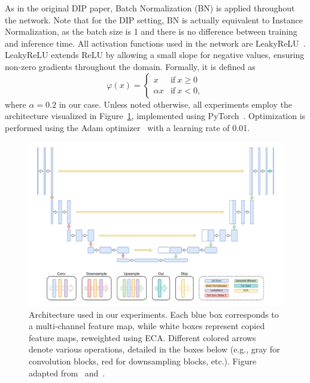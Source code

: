 As in the original DIP paper, Batch Normalization (BN) is applied throughout the network.
Note that for the DIP setting, BN is actually equivalent to Instance Normalization, as the batch size is 1 and there is no difference between training and inference time.
All activation functions used in the network are LeakyReLU~\cite{LeakyReLU}.
LeakyReLU extends ReLU by allowing a small slope for negative values, ensuring non-zero gradients throughout the domain.
Formally, it is defined as
\begin{equation}
    \varphi(x) = \begin{cases}
        x &\text{if}\ x \geq 0\\
        \alpha x &\text{if}\ x < 0,
    \end{cases}
\end{equation}
where $\alpha = 0.2$ in our case.
Unless noted otherwise, all experiments employ the architecture visualized in Figure~\ref{fig:architecture}, implemented using PyTorch~\cite{PyTorch}.
Optimization is performed using the Adam optimizer~\cite{Adam} with a learning rate of 0.01.

\begin{figure}
    \centering
    \includegraphics[width=\textwidth]{img/fig_5.2.pdf}
    \caption{
        Architecture used in our experiments.
        Each blue box corresponds to a multi-channel feature map, while white boxes represent copied feature maps, reweighted using ECA\@.
        Different colored arrows denote various operations, detailed in the boxes below (e.g., gray for convolution blocks, red for downsampling blocks, etc.).
        Figure adapted from~\cite{U-Net} and~\cite{DIP}.
    }\label{fig:architecture}
\end{figure}

